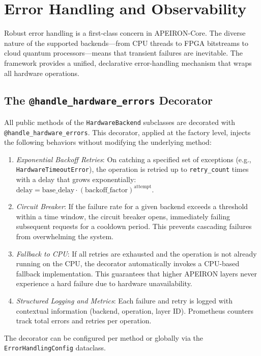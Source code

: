 \newpage
\section{Error Handling and Observability}

Robust error handling is a first-class concern in APEIRON-Core. The diverse nature of the supported backends—from CPU threads to FPGA bitstreams to cloud quantum processors—means that transient failures are inevitable. The framework provides a unified, declarative error-handling mechanism that wraps all hardware operations.

\subsection{The \texttt{@handle\_hardware\_errors} Decorator}

All public methods of the \texttt{HardwareBackend} subclasses are decorated with \texttt{@handle\_hardware\_errors}. This decorator, applied at the factory level, injects the following behaviors without modifying the underlying method:

\begin{enumerate}
    \item \textit{Exponential Backoff Retries}: On catching a specified set of exceptions (e.g., \texttt{HardwareTimeoutError}), the operation is retried up to \texttt{retry\_count} times with a delay that grows exponentially: \(\text{delay} = \text{base\_delay} \cdot (\text{backoff\_factor})^{\text{attempt}}\).
    \item \textit{Circuit Breaker}: If the failure rate for a given backend exceeds a threshold within a time window, the circuit breaker opens, immediately failing subsequent requests for a cooldown period. This prevents cascading failures from overwhelming the system.
    \item \textit{Fallback to CPU}: If all retries are exhausted and the operation is not already running on the CPU, the decorator automatically invokes a CPU-based fallback implementation. This guarantees that higher APEIRON layers never experience a hard failure due to hardware unavailability.
    \item \textit{Structured Logging and Metrics}: Each failure and retry is logged with contextual information (backend, operation, layer ID). Prometheus counters track total errors and retries per operation.
\end{enumerate}

The decorator can be configured per method or globally via the \texttt{ErrorHandlingConfig} dataclass.


